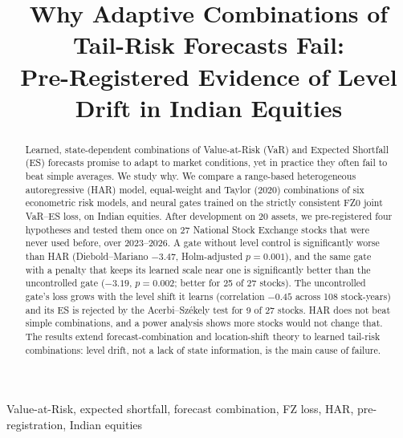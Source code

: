 \documentclass[conference]{IEEEtran}
\begin{document}
\title{Why Adaptive Combinations of Tail-Risk Forecasts Fail:\\
Pre-Registered Evidence of Level Drift in Indian Equities}

\author{
}

\maketitle

\begin{abstract}
Learned, state-dependent combinations of Value-at-Risk (VaR) and Expected Shortfall (ES) forecasts promise to adapt to market conditions, yet in practice they often fail to beat simple averages. We study why. We compare a range-based heterogeneous autoregressive (HAR) model, equal-weight and Taylor (2020) combinations of six econometric risk models, and neural gates trained on the strictly consistent FZ0 joint VaR--ES loss, on Indian equities. After development on 20 assets, we pre-registered four hypotheses and tested them once on 27 National Stock Exchange stocks that were never used before, over 2023--2026. A gate without level control is significantly worse than HAR (Diebold--Mariano $-3.47$, Holm-adjusted $p=0.001$), and the same gate with a penalty that keeps its learned scale near one is significantly better than the uncontrolled gate ($-3.19$, $p=0.002$; better for 25 of 27 stocks). The uncontrolled gate's loss grows with the level shift it learns (correlation $-0.45$ across 108 stock-years) and its ES is rejected by the Acerbi--Sz\'ekely test for 9 of 27 stocks. HAR does not beat simple combinations, and a power analysis shows more stocks would not change that. The results extend forecast-combination and location-shift theory to learned tail-risk combinations: level drift, not a lack of state information, is the main cause of failure.
\end{abstract}

\begin{IEEEkeywords}
Value-at-Risk, expected shortfall, forecast combination, FZ loss, HAR, pre-registration, Indian equities
\end{IEEEkeywords}
\end{document}
